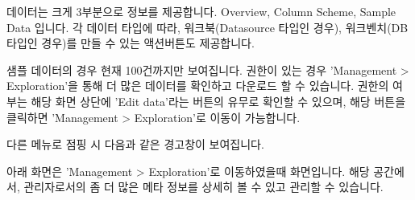 \documentclass[letterpaper,10pt,english]{sphinxmanual}
\begin{document}
데이터는 크게 3부분으로 정보를 제공합니다. Overview, Column Scheme, Sample Data 입니다.
각 데이터 타입에 따라, 워크북(Datasource 타입인 경우), 워크벤치(DB 타입인 경우)를 만들 수 있는 액션버튼도 제공합니다.
\begin{quote}

\begin{figure}[H]
\centering

\noindent{}
\end{figure}
\end{quote}

샘플 데이터의 경우 현재 100건까지만 보여집니다. 권한이 있는 경우 'Management \textgreater{} Exploration'을 통해 더 많은 데이터를 확인하고 다운로드 할 수 있습니다.
권한의 여부는 해당 화면 상단에 'Edit data'라는 버튼의 유무로 확인할 수 있으며, 해당 버튼을 클릭하면 'Management \textgreater{} Exploration'로 이동이 가능합니다.
\begin{quote}

\begin{figure}[H]
\centering

\noindent{}
\end{figure}
\end{quote}

다른 메뉴로 점핑 시 다음과 같은 경고창이 보여집니다.
\begin{quote}

\begin{figure}[H]
\centering

\noindent{}
\end{figure}
\end{quote}

아래 화면은 'Management \textgreater{} Exploration'로 이동하였을때 화면입니다. 해당 공간에서, 관리자로서의 좀 더 많은 메타 정보를 상세히 볼 수 있고 관리할 수 있습니다.
\begin{quote}

\begin{figure}[H]
\centering

\noindent{}
\end{figure}

\begin{figure}[H]
\centering

\noindent{}
\end{figure}
\end{quote}
\end{document}
